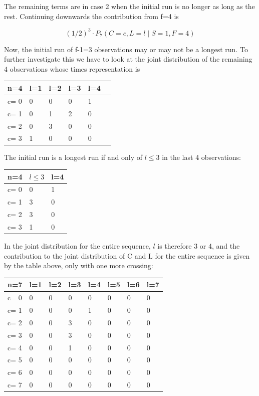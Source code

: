 The remaining terms are in case 2 when the initial run is no longer as long as the rest. Continuing downwards the contribution from f=4 is 

$$(1/2)^3 \cdot   P_7 (C=c, L=l \mid S=1,F=4)$$

Now, the initial run of f-1=3 observations may or may not be a longest run. To further investigate this we have to look at the joint distribution of the remaining 4 observations whose times representation is 

\begin{tabular}{l | l l l l l}
\hline
n=4&l=1&l=2&l=3&l=4\\
\hline
c= 0& 0& 0& 0& 1\\
c= 1& 0& 1& 2& 0\\
c= 2& 0& 3& 0& 0\\
c= 3& 1& 0& 0& 0\\
\hline
\end{tabular}

The initial run is a longest run if and only of $l \leq 3$ in the last 4 observations:

\begin{tabular}{l | l l}
\hline
n=4&$l \leq 3$&l=4\\
\hline
c= 0& 0& 1\\
c= 1& 3& 0\\
c= 2& 3& 0\\
c= 3& 1& 0\\
\hline
\end{tabular}

In the joint distribution for the entire sequence, $l$ is therefore 3 or 4, and the contribution to the joint distribution of C and L for the entire sequence is given by the table above, only with one more crossing:

\begin{tabular}{l | l l l l l l l}
\hline
n=7&l=1&l=2&l=3&l=4&l=5&l=6&l=7\\
\hline
c= 0& 0& 0& 0& 0& 0& 0& 0\\
c= 1& 0& 0& 0& 1& 0& 0& 0\\
c= 2& 0& 0& 3& 0& 0& 0& 0\\
c= 3& 0& 0& 3& 0& 0& 0& 0\\
c= 4& 0& 0& 1& 0& 0& 0& 0\\
c= 5& 0& 0& 0& 0& 0& 0& 0\\
c= 6& 0& 0& 0& 0& 0& 0& 0\\
c= 7& 0& 0& 0& 0& 0& 0& 0\\
\hline
\end{tabular}


